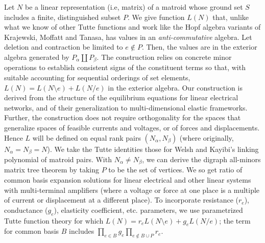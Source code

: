 \documentclass{article}
\begin{document}
Let $N$ be a linear representation (i.e, matrix) of a matroid whose
ground set $S$ includes a finite, distinguished subset $P$.  We give
function $L(N)$ that, unlike what we know of other Tutte functions and
work like the Hopf algebra variants of Krajewski, Moffatt and Tanasa,
has values in an \emph{anti-commutative} algebra. Let deletion and
contraction be limited to $e\not\in P$.  Then, the values are in the
exterior algebra generated by $P_\alpha \coprod P_\beta$.  The
construction relies on concrete minor operations to establish
consistent signs of the constituent terms so that, with suitable
accounting for sequential orderings of set elements,
$L(N)=L(N\setminus e)+L(N/e)$ in the exterior algebra. Our
construction is derived from the structure of the equilibrium
equations for linear electrical networks, and of their generalization
to multi-dimensional elastic frameworks.  Further, the construction
does not require orthogonality for the spaces that generalize spaces
of feasible currents and voltages, or of forces and displacements.
Hence $L$ will be defined on equal rank pairs $(N_\alpha, N_\beta)$
(where originally, $N_\alpha=N_\beta=N$).  We take the Tutte
identities those for Welsh and Kayibi's linking polynomial of matroid
pairs. With $N_\alpha\neq N_\beta$, we can derive the digraph
all-minors matrix tree theorem by taking $P$ to be the set of
vertices.  We so get ratio of common basis expansion solutions for
linear electrical and other linear systems with multi-terminal
amplifiers (where a voltage or force at one place is a multiple of
current or displacement at a different place).  To incorporate
resistance ($r_e$), conductance ($g_e$), elasticity coefficient,
etc. parameters, we use parametrized Tutte function theory for which
$L(N)=r_e L(N\setminus e)+ g_e L(N/e)$; the term for common basis $B$
includes $\prod _{e\in B} g_e \prod _{e\not\in B\cup P} r_e$.
\end{document}
